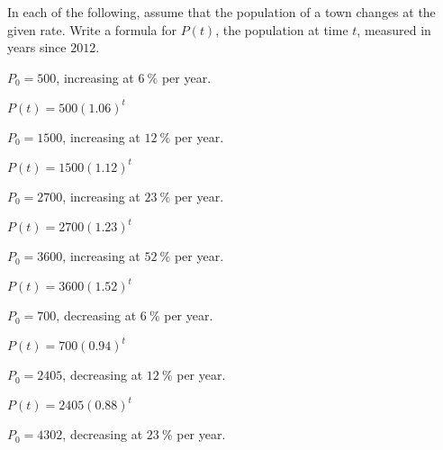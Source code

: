 \begin{exercises}
\begin{problem}
In each of the following, assume that the population of a town 
changes at the given rate.
Write a formula for $P(t)$, the population at time $t$,
measured in years since $2012$.
\begin{multicols}{2}
	\begin{subproblem}
		$P_0=500$, increasing at $\SI{6}{\percent}$ per year.
		\begin{shortsolution}
			$P(t)=500(1.06)^t$ 
		\end{shortsolution}
	\end{subproblem}
	\begin{subproblem}
		$P_0=1500$, increasing at $\SI{12}{\percent}$ per year.
		\begin{shortsolution}
			$P(t)=1500(1.12)^t$
		\end{shortsolution}
	\end{subproblem}
	\begin{subproblem}
		$P_0=2700$, increasing at $\SI{23}{\percent}$ per year.
		\begin{shortsolution}
			$P(t)=2700(1.23)^t$ 
		\end{shortsolution}
	\end{subproblem}
	\begin{subproblem}
		$P_0=3600$, increasing at $\SI{52}{\percent}$ per year.
		\begin{shortsolution}
			$P(t)=3600(1.52)^t$ 
		\end{shortsolution}
	\end{subproblem}
	\begin{subproblem}
		$P_0=700$, decreasing at $\SI{6}{\percent}$ per year.
		\begin{shortsolution}
			$P(t)=700(0.94)^t$ 
		\end{shortsolution}
	\end{subproblem}
	\begin{subproblem}
		$P_0=2405$, decreasing at $\SI{12}{\percent}$ per year.
		\begin{shortsolution}
			$P(t)=2405(0.88)^t$
		\end{shortsolution}
	\end{subproblem}
	\begin{subproblem}
		$P_0=4302$, decreasing at $\SI{23}{\percent}$ per year.
		\begin{shortsolution}

\end{shortsolution}
\end{subproblem}
\end{multicols}
\end{problem}
\end{exercises}
